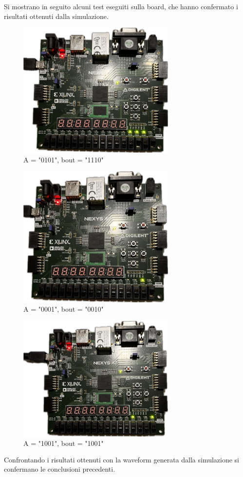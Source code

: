 Si mostrano in seguito alcuni test eseguiti sulla board, che hanno confermato i risultati ottenuti dalla simulazione.
\begin{figure}[H]
	\centering
	\includegraphics[width=0.7\textwidth]{img/testRom_M_1}
	\caption{A = "0101", bout = "1110"}
	\label{test1} 
\end{figure}

\begin{figure}[H]
	\centering
	\includegraphics[width=0.7\textwidth]{img/testRom_M_2}
	\caption{A = "0001", bout = "0010"}
	\label{SchemS} 
\end{figure}

\begin{figure}[H]
	\centering
	\includegraphics[width=0.7\textwidth]{img/testrom_M_3}
	\caption{A = "1001", bout = "1001"}
	\label{SchemS} 
\end{figure}
Confrontando i risultati ottenuti con la waveform generata dalla simulazione si confermano le conclusioni precedenti.



